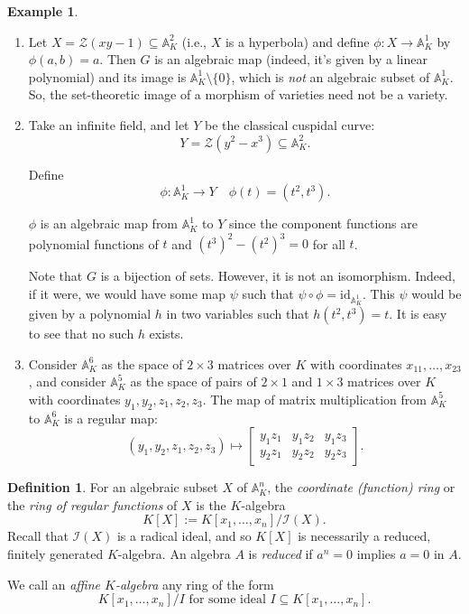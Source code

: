 \documentclass{amsart}[12pt]
\newcommand{\A}{\mathbb{A}}
\newcommand{\cZ}{\mathcal{Z}}
\newcommand{\cI}{\mathcal{I}}
\numberwithin{equation}{section}
\theoremstyle{plain} %
\theoremstyle{definition}
\newtheorem{defn}[equation]{Definition}
\newtheorem{ex}[equation]{Example}
\theoremstyle{remark}
\begin{document}
\begin{ex}
 \begin{enumerate} 
 \item Let $X = \cZ(xy -1) \subseteq \A^2_K$ (i.e., $X$ is a hyperbola) 
and define $\phi: X \to \A^1_K$ by $\phi(a,b) = a$. Then $G$ is an algebraic map (indeed, it's given by a linear polynomial) and its image is $\A^1_K\setminus \{0\}$, which is {\em not} an algebraic subset of $\A^1_K$. So,  the set-theoretic  image of a morphism of varieties  need
  not be a variety.
 \item \label{ex:cuspidal} Take an infinite field, and 
let $Y$ be the classical cuspidal curve:
$$
Y = \cZ(y^2 - x^3) \subseteq \A^2_K.
$$
\begin{center}
 \end{center}
Define
$$
\phi: \A^1_K \to Y \quad \phi(t) = (t^2, t^3).
$$

$\phi$ is an algebraic map from $\A^1_K$ to $Y$
since the component functions are polynomial functions of $t$ and $(t^3)^2 - (t^2)^3 = 0$ for all $t$.

Note that $G$ is a bijection of sets. However, it is not an isomorphism. Indeed, if it were, we would have some map $\psi$ such that $\psi\circ \phi = \mathrm{id}_{\A^1_K}$. This $\psi$ would be given by a polynomial $h$ in two variables such that $h(t^2,t^3) = t$. It is easy to see that no such $h$ exists.

\item Consider $\A^6_K$ as the space of $2 \times 3$ matrices over $K$ with coordinates $x_{11},\dots,x_{23}$, and consider $\A^5_K$ as the space of pairs of $2 \times 1$ and $1\times 3$ matrices over $K$ with coordinates $y_1,y_2, z_1,z_2,z_3$. The map of matrix multiplication from $\A^5_K$ to $\A^6_K$ is a regular map:
\[ (y_1,y_2,z_1,z_2,z_3)  \mapsto \begin{bmatrix} y_1 z_1 & y_1 z_2 & y_1 z_3 \\ y_2 z_1 & y_2 z_2 & y_2 z_3 \end{bmatrix}.\]
\end{enumerate}
\end{ex}

\begin{defn} For an algebraic subset $X$ of $\A^n_K$, the {\em coordinate (function) ring} or the {\em ring of regular functions} of $X$ is the $K$-algebra
$$
K[X] := K[x_1, \dots, x_n]/\cI(X).
$$
Recall that $\cI(X)$ is a radical ideal, and so $K[X]$ is necessarily a reduced, finitely generated $K$-algebra. 
An algebra $A$ is {\em reduced} if $a^n=0$ implies $a=0$ in $A$.

We call an {\em affine $K$-algebra}  any ring of the form 
\[
K[x_1,\ldots, x_n]/I \text{ for some ideal } I\subseteq K[x_1,\ldots, x_n].
\]
\end{defn}
\end{document}
